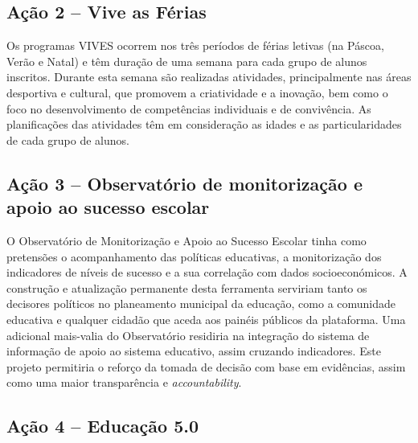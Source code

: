 \documentclass[
]{book}
\begin{document}
\hypertarget{auxe7uxe3o-2-vive-as-fuxe9rias}{%
\subsection{\texorpdfstring{\textbf{Ação 2 -- Vive as Férias}}{Ação 2 -- Vive as Férias}}\label{auxe7uxe3o-2-vive-as-fuxe9rias}}

Os programas VIVES ocorrem nos três períodos de férias letivas (na Páscoa, Verão e Natal) e têm duração de uma semana para cada grupo de alunos inscritos. Durante esta semana são realizadas atividades, principalmente nas áreas desportiva e cultural, que promovem a criatividade e a inovação, bem como o foco no desenvolvimento de competências individuais e de convivência. As planificações das atividades têm em consideração as idades e as particularidades de cada grupo de alunos.

\hypertarget{auxe7uxe3o-3-observatuxf3rio-de-monitorizauxe7uxe3o-e-apoio-ao-sucesso-escolar}{%
\subsection{\texorpdfstring{\textbf{Ação 3 -- Observatório de monitorização e apoio ao sucesso escolar}}{Ação 3 -- Observatório de monitorização e apoio ao sucesso escolar}}\label{auxe7uxe3o-3-observatuxf3rio-de-monitorizauxe7uxe3o-e-apoio-ao-sucesso-escolar}}

O Observatório de Monitorização e Apoio ao Sucesso Escolar tinha como pretensões o acompanhamento das políticas educativas, a monitorização dos indicadores de níveis de sucesso e a sua correlação com dados socioeconómicos. A construção e atualização permanente desta ferramenta serviriam tanto os decisores políticos no planeamento municipal da educação, como a comunidade educativa e qualquer cidadão que aceda aos painéis públicos da plataforma. Uma adicional mais-valia do Observatório residiria na integração do sistema de informação de apoio ao sistema educativo, assim cruzando indicadores. Este projeto permitiria o reforço da tomada de decisão com base em evidências, assim como uma maior transparência e \emph{accountability}.

\hypertarget{auxe7uxe3o-4-educauxe7uxe3o-5.0}{%
\subsection{\texorpdfstring{\textbf{Ação 4 -- Educação 5.0}}{Ação 4 -- Educação 5.0}}\label{auxe7uxe3o-4-educauxe7uxe3o-5.0}}
\end{document}
